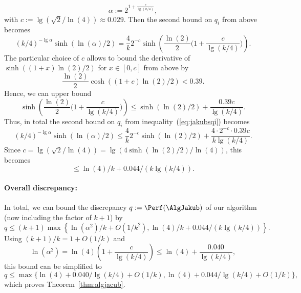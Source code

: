 {\[
  \alpha := 2^{1 + \frac{c}{\lg(k/4)} },
\]
with $c := \lg( \sqrt{2} / \ln(4)) \approx 0.029$.
Then the second bound on $q_i$ from above becomes
\[
  (k/4)^{-\lg \alpha} \sinh( \ln(\alpha)/2) = \frac 4k 2^{-c} \sinh\left( \frac{\ln(2)}{2} \Big(1+\frac{c}{\lg(k/4)}\Big)\right).
\]
The particular choice of $c$ allows to bound the derivative of $\sinh((1+x) \ln(2)/2)$ for $x \in [0,c]$ from above by 
\[
  \frac{\ln(2)}{2} \cosh((1+c) \ln(2)/2) < 0.39.
\]
Hence, we can upper bound 
\[
  \sinh\left( \frac{\ln(2)}{2} \Big(1+\frac{c}{\lg(k/4)}\Big)\right) \le \sinh(\ln(2)/2) + \frac{0.39 c}{\lg(k/4)}.
\]
Thus, in total the second bound on $q_i$ from inequality~(\ref{eq:jakubsqi}) becomes 
\[
  (k/4)^{-\lg \alpha} \sinh( \ln(\alpha)/2) 
  \le  \frac 4k 2^{-c} \sinh(\ln(2)/2) + \frac{4 \cdot 2^{-c} \cdot 0.39 c}{k \lg(k/4)}.
\]
Since $c = \lg( \sqrt{2} / \ln(4)) = \lg( 4 \sinh(\ln(2)/2) / \ln(4) )$, this becomes 
\[
  \le \ln(4)/k + 0.044 / (k \lg(k/4)).
\]

\paragraph{Overall discrepancy:} 
In total, we can bound the discrepancy $q := \Perf(\AlgJakub)$ of our algorithm (now including the factor of $k+1$) by
\[
  q \le (k+1) \max\left\{ \ln(\alpha^2)/k + O(1/k^2), \ln(4)/k + 0.044/(k \lg(k/4)) \right\}.
\]
Using $(k+1)/k = 1 + O(1/k)$ and 
\[
  \ln(\alpha^2) = \ln(4) \left( 1 + \frac{c}{\lg(k/4)} \right) \le \ln(4) + \frac{0.040}{\lg(k/4)},
\]
this bound can be simplified to
\[
  q \le \max\{ \ln(4) + 0.040/\lg(k/4) + O(1/k), \ln(4) + 0.044/\lg(k/4) + O(1/k) \},
\]
which proves Theorem~\ref{thm:algjacub}.
}
